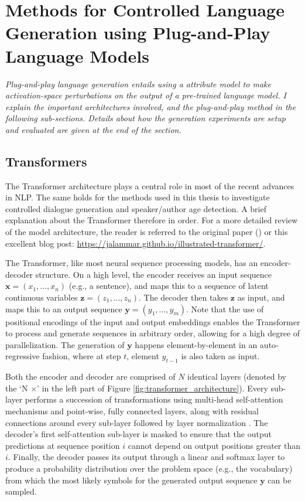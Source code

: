 \section{Methods for Controlled Language Generation using Plug-and-Play Language Models}
\label{sec:exp2_methods}

\textit{Plug-and-play language generation entails using a attribute model to make activation-space perturbations on the output of a pre-trained language model. I explain the important architectures involved, and the plug-and-play method in the following sub-sections. Details about how the generation experiments are setup and evaluated are given at the end of the section.}


\subsection{Transformers}

The Transformer architecture plays a central role in most of the recent advances in NLP. The same holds for the methods used in this thesis to investigate controlled dialogue generation and speaker/author age detection. A brief explanation about the Transformer therefore in order. For a more detailed review of the model architecture, the reader is referred to the original paper (\citep{vaswani2017attention}) or this excellent blog post: \url{https://jalammar.github.io/illustrated-transformer/}.

The Transformer, like most neural sequence processing models, has an encoder-decoder structure. On a high level, the encoder receives an input sequence $\textbf{x} = (x_1, ..., x_n)$ (e.g., a sentence), and maps this to a sequence of latent continuous variables $\textbf{z} = (z_1, ..., z_n)$. The decoder then takes $\textbf{z}$ as input, and maps this to an output sequence $\textbf{y} = (y_1, ..., y_m)$. Note that the use of positional encodings of the input and output embeddings enables the Transformer to process and generate sequences in arbitrary order, allowing for a high degree of parallelization. The generation of $\textbf{y}$ happens element-by-element in an auto-regressive fashion, where at step $t$, element $y_{t - 1}$ is also taken as input.

Both the encoder and decoder are comprised of $N$ identical layers (denoted by the `N $\times$' in the left part of Figure \ref{fig:transformer_architecture}). Every sub-layer performs a succession of transformations using multi-head self-attention mechanisms and point-wise, fully connected layers, along with residual connections \citep{he2016residual} around every sub-layer followed by layer normalization \citep{DBLP:journals/corr/BaKH16}. The decoder's first self-attention sub-layer is masked to ensure that the output predictions at sequence position $i$ cannot depend on output positions greater than $i$. Finally, the decoder passes its output through a linear and softmax layer to produce a probability distribution over the problem space (e.g., the vocabulary) from which the most likely symbols for the generated output sequence $\textbf{y}$ can be sampled.

